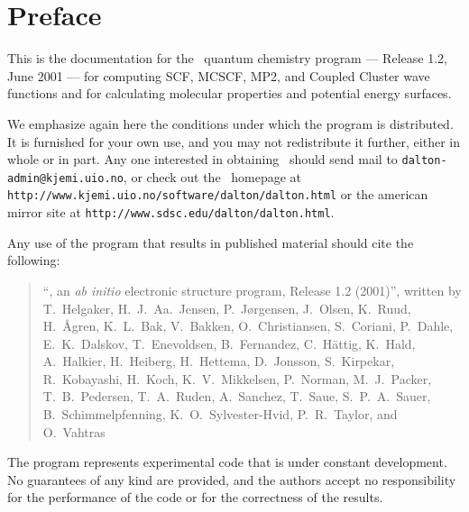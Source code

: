 \tableofcontents

\chapter*{Preface}

          This is the documentation for the \siraba\ 
quantum chemistry program --- Release 1.2, June 2001 --- for computing SCF,
MCSCF, MP2, and Coupled Cluster wave functions and for calculating 
molecular properties and potential energy surfaces.

          We emphasize again here the conditions under which the
program is distributed.  It is furnished for your own use,
and you may not redistribute it further, either in whole or in
part.  Any one interested in obtaining \siraba\ should send mail to
\verb|dalton-admin@kjemi.uio.no|, or check out the \siraba\ homepage
at \newline
\verb|http://www.kjemi.uio.no/software/dalton/dalton.html| or the american mirror site at \verb|http://www.sdsc.edu/dalton/dalton.html|.

          Any use of the program that results in published
material should cite the following:
\begin{quote}
``\siraba , an {\em ab initio} electronic  structure program, Release
1.2 (2001)'', written by 
T.~Helgaker, H.~J.~Aa.~Jensen, P.~J{\o}rgensen, J.~Olsen,
K.~Ruud, H.~{\AA}gren,
K.~L.~Bak, 
V.~Bakken,
O.~Christiansen, 
S.~Coriani, 
P.~Dahle, 
E.~K.~Dalskov,
T.~Enevoldsen, 
B.~Fernandez,
C.~H{\"a}ttig,
K.~Hald,
A.~Halkier,
H.~Heiberg,
H.~Hettema, 
D.~Jonsson, 
S.~Kirpekar,
R.~Kobayashi,
H.~Koch,
K.~V.~Mikkelsen,
P.~Norman, 
M.~J.~Packer, 
T.~B.~Pedersen,
T.~A.~Ruden,
A.~Sanchez,
T.~Saue,
S.~P.~A.~Sauer,
B.~Schimmelpfenning,
K.~O.~Sylvester-Hvid,
P.~R.~Taylor, 
and O.~Vahtras
\end{quote}

          The program represents experimental code that is
under constant development.  No guarantees of any kind are
provided, and the authors accept no responsibility for the
performance of the code or for the correctness of the results.
